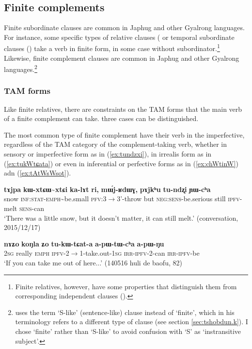 \documentclass[oneside,a4paper,11pt]{article}
\newcommand{\ipa}[1]{\textbf{\phon#1}} %
\newcommand{\tld}{\textasciitilde{}}
\begin{document}
 \subsection{Finite complements} 
Finite subordinate clauses are common in Japhug and other Gyalrong languages. For instance, some specific types of relative clauses (\citealt{jackson06guanxiju, jacques16relatives} or temporal subordinate clauses (\citealt{jacques14linking}) take a verb in finite form, in some case without subordinator.\footnote{Finite relatives, however, have some properties that distinguish them from corresponding independent clauses (\citealt[18-21]{jacques16relatives}).} Likewise, finite complement clauses are common in Japhug and other Gyalrong languages.\footnote{\citet[475-7]{sun12complementation} uses the term `S-like' (sentence-like) clause instead of `finite', which in his terminology refers to a different type of clause (see section \ref{sec:tshobdun.k}). I chose `finite' rather than `S-like' to avoid confusion with `S' as  `instransitive subject'. }


\subsubsection{TAM forms} \label{sec:TAM.finite}
Like finite relatives, there are constraints on the TAM forms that the main verb of a finite complement can take. three cases can be distinguished.

The most common type of finite complement have their verb in the imperfective, regardless of the TAM category of the complement-taking verb, whether in sensory or imperfective form as in (\ref{ex:tundzxi}), in irrealis form as in (\ref{ex:tukWtɕata}) or even in inferential or perfective forms as in (\ref{ex:chWtinW}) adn (\ref{ex:tAtWsWsot}).

\begin{exe}
\ex \label{ex:tundzxi}
\gll 
\ipa{tɤjpa} 	\ipa{kɯ-xtɕɯ\tld{}xtɕi} 	\ipa{ka-lɤt} 	\ipa{ri,} 	\ipa{mɯ́j-ʁdɯɣ,} 	\ipa{pɤjkʰu} 	\ipa{tu-ndʐi} 	\ipa{ɲɯ-cʰa} \\
snow \textsc{inf:stat-emph}\tld{}be.small \textsc{pfv}:3$\rightarrow$3'-throw but \textsc{neg:sens}-be.serious still \textsc{ipfv}-melt \textsc{sens}-can \\
\glt `There was a little snow, but it doesn't matter, it can still melt.' (conversation, 2015/12/17)
\end{exe}

\begin{exe}
\ex \label{ex:tukWtɕata}
\gll 
\ipa{nɤʑo} 	\ipa{koŋla} 	\ipa{ʑo} 	\ipa{tu-kɯ-tɕat-a} 	\ipa{a-pɯ-tɯ-cʰa} 	\ipa{a-pɯ-ŋu} 	\\
\textsc{2sg} really \textsc{emph} \textsc{ipfv}-2$\rightarrow$1-take.out-\textsc{1sg} \textsc{irr-ipfv}-2-can \textsc{irr-ipfv}-be \\
\glt `If you can take me out of here...' (140516 huli de baofu, 82)
\end{exe}
\end{document}
